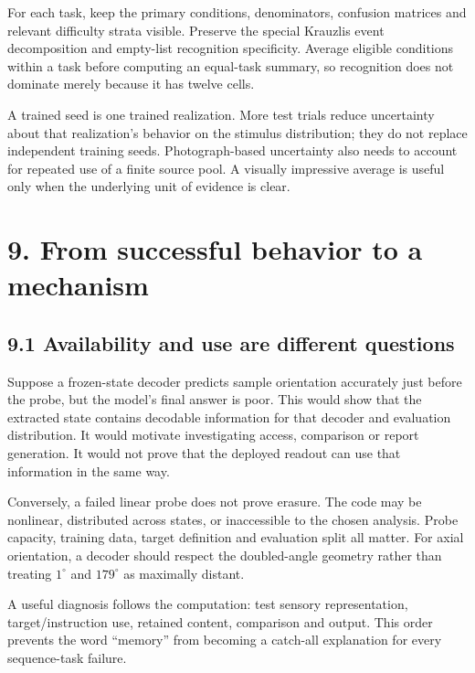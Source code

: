 \documentclass[
  11pt,
]{article}
\let\oldsubsection\subsection
\renewcommand{\subsection}{\Needspace{6\baselineskip}\oldsubsection}
\begin{document}
For each task, keep the primary conditions, denominators, confusion
matrices and relevant difficulty strata visible. Preserve the special
Krauzlis event decomposition and empty-list recognition specificity.
Average eligible conditions within a task before computing an equal-task
summary, so recognition does not dominate merely because it has twelve
cells.

A trained seed is one trained realization. More test trials reduce
uncertainty about that realization's behavior on the stimulus
distribution; they do not replace independent training seeds.
Photograph-based uncertainty also needs to account for repeated use of a
finite source pool. A visually impressive average is useful only when
the underlying unit of evidence is clear.

\newpage

\section{9. From successful behavior to a
mechanism}\label{from-successful-behavior-to-a-mechanism}

\subsection{9.1 Availability and use are different
questions}\label{availability-and-use-are-different-questions}

Suppose a frozen-state decoder predicts sample orientation accurately
just before the probe, but the model's final answer is poor. This would
show that the extracted state contains decodable information for that
decoder and evaluation distribution. It would motivate investigating
access, comparison or report generation. It would not prove that the
deployed readout can use that information in the same way.

Conversely, a failed linear probe does not prove erasure. The code may
be nonlinear, distributed across states, or inaccessible to the chosen
analysis. Probe capacity, training data, target definition and
evaluation split all matter. For axial orientation, a decoder should
respect the doubled-angle geometry rather than treating \(1^\circ\) and
\(179^\circ\) as maximally distant.

A useful diagnosis follows the computation: test sensory representation,
target/instruction use, retained content, comparison and output. This
order prevents the word ``memory'' from becoming a catch-all explanation
for every sequence-task failure.
\end{document}

